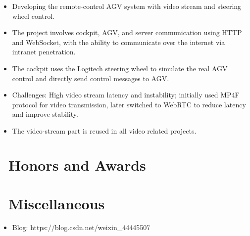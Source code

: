 \documentclass[a4paper,10pt]{resume}
\begin{document}
\begin{itemize}[parsep=0.5ex]
  \item Developing the remote-control AGV system with video stream and steering wheel control.
  \item The project involves cockpit, AGV, and server communication using HTTP and WebSocket, with the ability to communicate over the internet via intranet penetration.
  \item The cockpit uses the Logitech steering wheel to simulate the real AGV control and directly send control messages to AGV.
  \item Challenges: High video stream latency and instability; initially used MP4F protocol for video transmission, later switched to WebRTC to reduce latency and improve stability.
  \item The video-stream part is reused in all video related projects.
\end{itemize}

\section{\faHeartO\ Honors and Awards}

\section{\faInfo\ Miscellaneous}
\begin{itemize}[parsep=0.5ex]
  \item Blog: https://blog.csdn.net/weixin\_44445507
\end{itemize}

%
%
\end{document}
